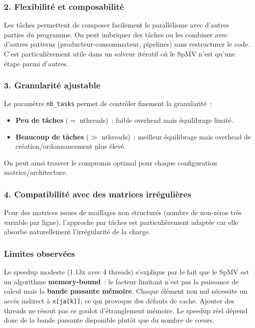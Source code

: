 \documentclass[12pt,a4paper]{article}
\begin{document}
\subsubsection{2. Flexibilité et composabilité}

Les tâches permettent de composer facilement le parallélisme avec d'autres parties du programme. On peut imbriquer des tâches ou les combiner avec d'autres patterns (producteur-consommateur, pipelines) sans restructurer le code. C'est particulièrement utile dans un solveur itératif où le SpMV n'est qu'une étape parmi d'autres.

\subsubsection{3. Granularité ajustable}

Le paramètre \texttt{nb\_tasks} permet de contrôler finement la granularité~:
\begin{itemize}
  \item \textbf{Peu de tâches} ($=$ nthreads)~: faible overhead mais équilibrage limité.
  \item \textbf{Beaucoup de tâches} ($\gg$ nthreads)~: meilleur équilibrage mais overhead de création/ordonnancement plus élevé.
\end{itemize}
On peut ainsi trouver le compromis optimal pour chaque configuration matrice/architecture.

\subsubsection{4. Compatibilité avec des matrices irrégulières}

Pour des matrices issues de maillages non structurés (nombre de non-zéros très variable par ligne), l'approche par tâches est particulièrement adaptée car elle absorbe naturellement l'irrégularité de la charge.

\subsubsection{Limites observées}

Le speedup modeste (1.13x avec 4 threads) s'explique par le fait que le SpMV est un algorithme \textbf{memory-bound}~: le facteur limitant n'est pas la puissance de calcul mais la \textbf{bande passante mémoire}. Chaque élément non nul nécessite un accès indirect à \texttt{x[ja[k]]}, ce qui provoque des défauts de cache. Ajouter des threads ne résout pas ce goulot d'étranglement mémoire. Le speedup réel dépend donc de la bande passante disponible plutôt que du nombre de c\oe urs.
\end{document}
